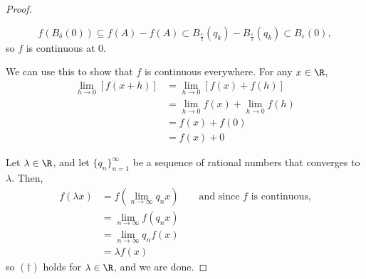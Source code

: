 \documentclass[12pt,letterpaper]{article}
\begin{document}
\begin{enumerate}
\begin{proof}
\begin{itemize}
	$$f(B_\delta(0))\subseteq f(A)-f(A)\subset B_\frac{\varepsilon}{2}(q_k)-B_\frac{\varepsilon}{2}(q_k)\subset B_\varepsilon(0),$$
	so $f$ is continuous at 0. 
	\qedwhite
	\end{itemize}
	
We can use this to show that $f$ is continuous everywhere. For any $x\in\R$, 
\begin{align*}
\lim_{h\to0}\left[f(x+h)\right]&=\lim_{h\to0}\left[f(x)+f(h)\right]\\
&=\lim_{h\to0}f(x)+\lim_{h\to0}f(h)\\
&=f(x)+f(0)\\
&=f(x)+0
\end{align*}

Let $\lambda\in\R$, and let $\{q_n\}_{n=1}^\infty$ be a sequence of rational numbers that converges to $\lambda$. Then,
\begin{align*}
f(\lambda x)&=f\left(\lim_{n\to\infty}q_n x\right) \quad\quad \text{and since $f$ is continuous,}\\
&=\lim_{n\to\infty}f\left(q_n x\right)\\
&=\lim_{n\to\infty}q_nf\left( x\right)\\
&=\lambda f(x)
\end{align*}
so $(\dagger)$ holds for $\lambda\in \R$, and we are done. 
\end{proof}


\end{enumerate}
\end{document}
